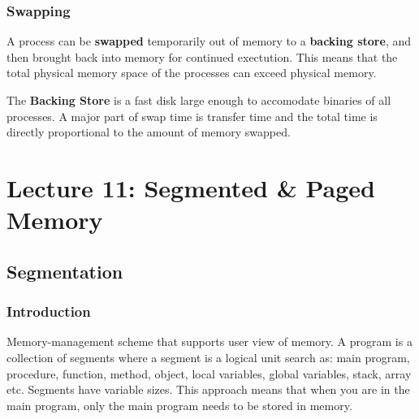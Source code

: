 \documentclass{article}%
\begin{document}
\subsubsection{Swapping}
\label{sec:org540993f}
A process can be \textbf{swapped} temporarily out of memory to a \textbf{backing store}, and then brought back into memory for continued exectution.
This means that the total physical memory space of the processes can exceed physical memory.

The \textbf{Backing Store} is a fast disk large enough to accomodate binaries of all processes.
A major part of swap time is transfer time and the total time is directly proportional to the amount of memory swapped.

\maketitle
\section{Lecture 11: Segmented \& Paged Memory}


\subsection{Segmentation}
\label{sec:org9dd22a9}
\subsubsection{Introduction}
\label{sec:org58c8edb}
Memory-management scheme that supports user view of memory.
A program is a collection of segments where a segment is a logical unit search as: main program, procedure, function, method, object, local variables, global variables, stack, array etc.
Segments have variable sizes.
This approach means that when you are in the main program, only the main program needs to be stored in memory.
\end{document}
